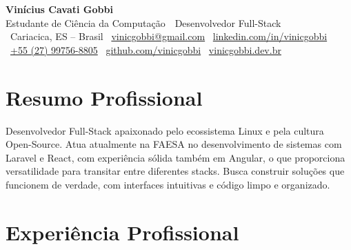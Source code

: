 \documentclass[10.5pt,a4paper]{article}
\begin{document}
\begin{center}
  {\Huge\bfseries\color{accent} Vinícius Cavati Gobbi}\\[5pt]
  {\large Estudante de Ciência da Computação \,\textbardbl\, Desenvolvedor Full-Stack}\\[8pt]
  {\small
    \faMapMarker\ Cariacica, ES -- Brasil
    \hspace{10pt}\textcolor{ruleline}{\vline}\hspace{10pt}
    \faEnvelope\ \href{mailto:vinicgobbi@gmail.com}{vinicgobbi@gmail.com}
    \hspace{10pt}\textcolor{ruleline}{\vline}\hspace{10pt}
    \faLinkedin\ \href{https://linkedin.com/in/vinicgobbi}{linkedin.com/in/vinicgobbi}\\[4pt]
    \faWhatsapp\ \href{https://wa.me/5527997568805}{+55 (27) 99756-8805}
    \hspace{10pt}\textcolor{ruleline}{\vline}\hspace{10pt}
    \faGithub\ \href{https://github.com/vinicgobbi}{github.com/vinicgobbi}
    \hspace{10pt}\textcolor{ruleline}{\vline}\hspace{10pt}
    \faGlobe\ \href{https://vinicgobbi.dev.br}{vinicgobbi.dev.br}
  }
\end{center}

\section*{Resumo Profissional}
\justifying
Desenvolvedor Full-Stack apaixonado pelo ecossistema Linux e pela cultura Open-Source.
Atua atualmente na FAESA no desenvolvimento de sistemas com Laravel e React, com
experiência sólida também em Angular, o que proporciona versatilidade para transitar
entre diferentes stacks. Busca construir soluções que funcionem de verdade, com
interfaces intuitivas e código limpo e organizado.

\section*{Experiência Profissional}
\end{document}
